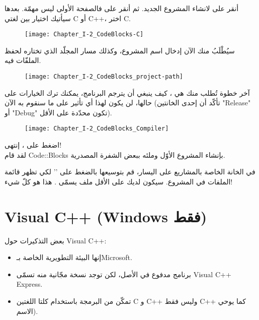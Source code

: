 أنقر على
لانشاء المشروع الجديد. ثم أنقر على
فالصفحة الأولى ليس مهمّة. بعدها سيأتيك اختيار بين لغتي \textenglish{C}
أو \textenglish{C++}،
اختر \textenglish{C}.

\begin{figure}[H]
	\centering
	\texttt{[image: Chapter\_I-2\_CodeBlocks-C]}
\end{figure}

سيُطْلَبُ منك الآن إدخال اسم المشروع، وكذلك مسار المجلّد الذي تختاره لحفظ الملفّات فيه.

\begin{figure}[H]
	\centering
	\texttt{[image: Chapter\_I-2\_CodeBlocks\_project-path]}
\end{figure}

آخر خطوة تُطلب منك هي ، كيف ينبغي أن يترجم البرنامج، يمكنك ترك الخيارات على حالها، لن يكون لهذا أي تأثير على ما سنقوم به الآن (تأكّد أن إحدى الخانتين
"\textenglish{Release}"
أو
"\textenglish{Debug}"
تكون محدّدة على الأقل).

\begin{figure}[H]
	\centering
	\texttt{[image: Chapter\_I-2\_CodeBlocks\_Compiler]}
\end{figure}

اضغط على
،
إنتهى!\\
لقد قام
\textenglish{Code::Blocks}
بإنشاء المشروع الأوّل وملئه ببعض الشفرة المصدرية.

في الخانة الخاصة بالمشاريع على اليسار، قم بتوسيعها بالضغط على
'\InlineCode{+}'
لكي تظهر قائمة الملفات في المشروع. سيكون لديك على الأقل ملف يسمّى
.
هذا هو كلّ شيء!

\section{\textenglish{Visual C++} (\textenglish{Windows} فقط)}

بعض التذكيرات حول
\textenglish{Visual C++}:

\begin{itemize}
  \item إنها البيئة التطويرية الخاصة بـ\textenglish{Microsoft}.
  \item برنامج مدفوع في الأصل، لكن توجد نسخة مجّانية منه تسمّى \textenglish{Visual C++ Express}.
  \item تمكّن من البرمجة باستخدام كلتا اللغتين
\textenglish{C}
و
\textenglish{C++}
 وليس فقط
\textenglish{C++}
كما يوحي الاسم).
\end{itemize}

